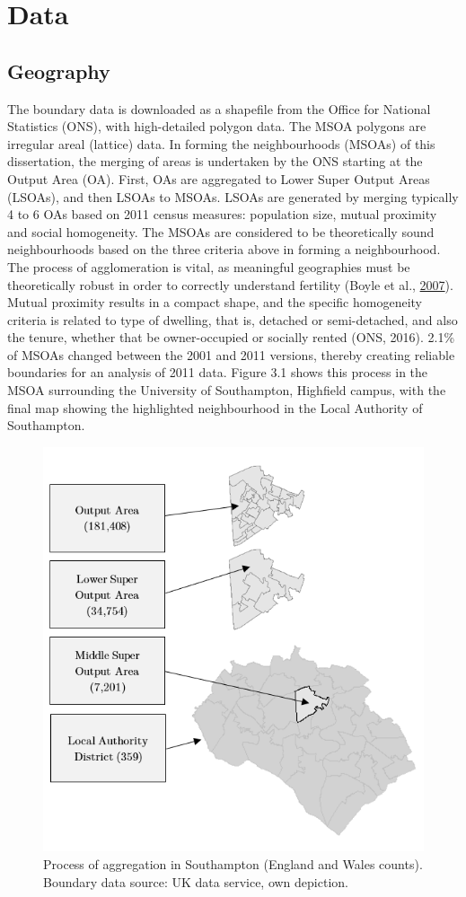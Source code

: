 \documentclass[12pt,twoside]{reedthesis}
\begin{document}
\hypertarget{Data}{%
\chapter{Data}\label{Data}}

\hypertarget{geography}{%
\section{Geography}\label{geography}}

The boundary data is downloaded as a shapefile from the Office for National Statistics (ONS), with high-detailed polygon data. The MSOA polygons are irregular areal (lattice) data. In forming the neighbourhoods (MSOAs) of this dissertation, the merging of areas is undertaken by the ONS starting at the Output Area (OA). First, OAs are aggregated to Lower Super Output Areas (LSOAs), and then LSOAs to MSOAs. LSOAs are generated by merging typically 4 to 6 OAs based on 2011 census measures: population size, mutual proximity and social homogeneity. The MSOAs are considered to be theoretically sound neighbourhoods based on the three criteria above in forming a neighbourhood. The process of agglomeration is vital, as meaningful geographies must be theoretically robust in order to correctly understand fertility (Boyle et al., \protect\hyperlink{ref-boyle2007}{2007}). Mutual proximity results in a compact shape, and the specific homogeneity criteria is related to type of dwelling, that is, detached or semi-detached, and also the tenure, whether that be owner-occupied or socially rented (ONS, 2016). 2.1\% of MSOAs changed between the 2001 and 2011 versions, thereby creating reliable boundaries for an analysis of 2011 data. Figure 3.1 shows this process in the MSOA surrounding the University of Southampton, Highfield campus, with the final map showing the highlighted neighbourhood in the Local Authority of Southampton.
\begin{figure}
\includegraphics[width=0.8\linewidth]{figure/Figure_2} \caption{Process of aggregation in Southampton (England and Wales counts). Boundary data source: UK data service, own depiction.}\label{fig:figure2}
\end{figure}
\end{document}
